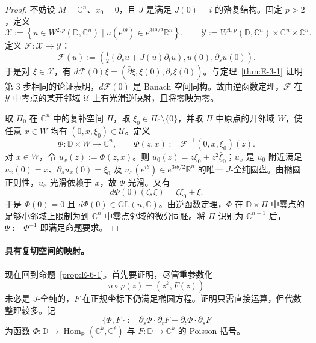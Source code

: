 \begin{proof}
不妨设 $M=\mathbb C^n$、$x_0=0$，且 $J$ 是满足 $J(0)=i$ 的殆复结构。固定 $p>2$，定义
\[
  \mathcal X:=\left\{u\in W^{2,p}(\mathbb D,\mathbb C^n)\mid
    u(e^{i\theta})\in e^{3i\theta/2}\mathbb R^n\right\},
  \qquad
  \mathcal Y:=W^{1,p}(\mathbb D,\mathbb C^n)
     \times\mathbb C^n\times\mathbb C^n.
\]
定义 $\mathcal F:\mathcal X\to\mathcal Y$：
\[
  \mathcal F(u):=\left(\tfrac12(\partial_su+J(u)\partial_tu),
                        u(0),\partial_su(0)\right).
\]
于是对 $\xi\in\mathcal X$，有 $d\mathcal F(0)\xi=(\bar\partial\xi,\xi(0),\partial_s\xi(0))$。与定理~\ref{thm:E-3-1} 证明第 3 步相同的论证表明，$d\mathcal F(0)$ 是 Banach 空间同构。故由逆函数定理，$\mathcal F$ 在 $\mathcal Y$ 中零点的某开邻域 $\mathcal U$ 上有光滑逆映射，且将零映为零。

取 $\Pi_0$ 在 $\mathbb C^n$ 中的复补空间 $\Pi$，取 $\xi_0\in\Pi_0\setminus\{0\}$，并取 $\Pi$ 中原点的开邻域 $W$，使任意 $x\in W$ 均有 $(0,x,\xi_0)\in\mathcal U$。定义
\[
  \Phi:\mathbb D\times W\to\mathbb C^n,\qquad
  \Phi(z,x):=\mathcal F^{-1}(0,x,\xi_0)(z).
\]
对 $x\in W$，令 $u_x(z):=\Phi(z,x)$。则 $u_0(z)=z\xi_0+z^2\bar\xi_0$；$u_x$ 是 $u_0$ 附近满足 $u_x(0)=x$、$\partial_su_x(0)=\xi_0$ 及 $u_x(e^{i\theta})\in e^{3i\theta/2}\mathbb R^n$ 的唯一 $J$-全纯圆盘。由椭圆正则性，$u_x$ 光滑依赖于 $x$，故 $\Phi$ 光滑。又有
\[
  d\Phi(0)(\zeta,\xi)=\zeta\xi_0+\xi.
\]
于是 $\Phi(0)=0$ 且 $d\Phi(0)\in\mathrm{GL}(n,\mathbb C)$。由逆函数定理，$\Phi$ 在 $\mathbb D\times\Pi$ 中零点的足够小邻域上限制为到 $\mathbb C^n$ 中零点邻域的微分同胚。将 $\Pi$ 识别为 $\mathbb C^{n-1}$ 后，$\Psi:=\Phi^{-1}$ 即满足命题要求。
\end{proof}

\paragraph{具有复切空间的映射。}
现在回到命题~\ref{prop:E-6-1}。首先要证明，尽管重参数化
\[
  u\circ\varphi(z)=(z^k,F(z))
\]
未必是 $J$-全纯的，$F$ 在正规坐标下仍满足椭圆方程。证明只需直接运算，但代数整理较多。记
\[
  \{\Phi,F\}:=\partial_s\Phi\cdot\partial_tF
                    -\partial_t\Phi\cdot\partial_sF
\]
为函数 $\Phi:\mathbb D\to\operatorname{Hom}_{\mathbb R}(\mathbb C^k,\mathbb C^\ell)$ 与 $F:\mathbb D\to\mathbb C^k$ 的 Poisson 括号。


